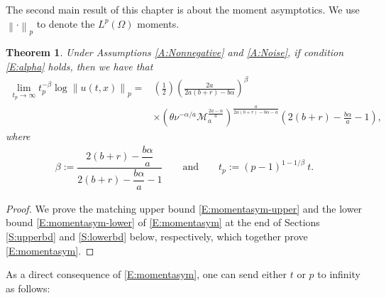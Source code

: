 \documentclass[12pt]{report}
\theoremstyle{plain}
\newtheorem{theorem}{Theorem}[section]
\theoremstyle{definition}
\numberwithin{equation}{section}
\newcommand{\Norm}[1]{\left\|  #1   \right\|}
\begin{document}
The second main result of this chapter is about the moment asymptotics. We use $\Norm{\cdot}_p$ to
denote the $L^p(\Omega)$ moments.


\begin{theorem} \label{T:asym}
	Under Assumptions \ref{A:Nonnegative} and \ref{A:Noise}, if condition \eqref{E:alpha} holds, then
	we have that
	\begin{equation}
	\label{E:momentasym}
	\begin{aligned}
	\lim_{t_p \to \infty} t_p^{-\beta} \log \Norm{u(t,x)}_p =
	& \left(\frac{1}{2}\right)\left(\frac{2a}{2a(b+r)- b\alpha} \right)^\beta \\
	& \times \left(\theta\nu^{-\alpha/a} \mathcal{M}_a^{\frac{2a-\alpha}{a}}\right)^{\frac{a}{2a(b+r)-b\alpha-a}}\left(2(b+r)-\frac{b\alpha}{a}-1\right),
	\end{aligned}
	\end{equation}
	where
	\begin{align}
	\label{E:beta-tp}
	\beta := \dfrac{2(b+r)-\dfrac{b\alpha}{a}}{ 2(b+r)-\dfrac{b\alpha}{a} -1 } \qquad \text{and} \qquad
	t_p   := (p-1)^{1-1/\beta} \: t.
	\end{align}
\end{theorem}
\begin{proof}
	We prove the matching upper bound \eqref{E:momentasym-upper} and the lower bound
	\eqref{E:momentasym-lower} of \eqref{E:momentasym} at the end of Sections \ref{S:upperbd} and
	\ref{S:lowerbd} below, respectively, which together prove \eqref{E:momentasym}.
\end{proof}

As a direct consequence of \eqref{E:momentasym}, one can send either $t$ or $p$ to infinity as follows:
\end{document}
